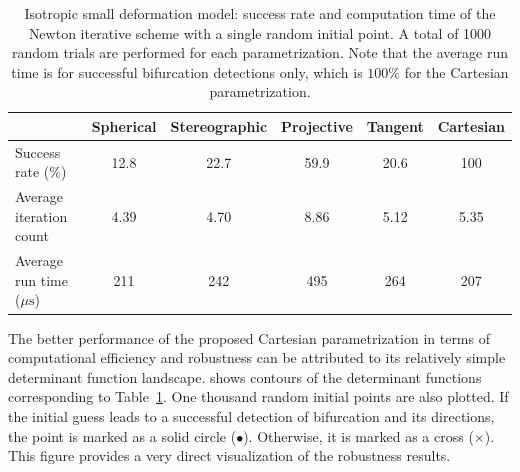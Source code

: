 \documentclass[12pt]{article}
\numberwithin{equation}{section}
\begin{document}
\begin{table}[!htbp]
  \begin{center}
    \begin{tabular}{l | c c c c c}
      \toprule
      & Spherical & Stereographic & Projective & Tangent & Cartesian \\
      \midrule
      Success rate ($\%$)      & 12.8 & 22.7 & 59.9  & 20.6  & 100   \\
      Average iteration count    & 4.39 & 4.70 & 8.86  & 5.12  & 5.35   \\
      Average run time (${\mu\text{s}}$) & 211  & 242  & 495  & 264  & 207 \\
      \bottomrule
    \end{tabular}
    \caption{Isotropic small deformation model: success rate and
      computation time of the Newton iterative scheme with a single
      random initial point. A total of 1000 random trials are
      performed for each parametrization. Note that the average run
      time is for successful bifurcation detections only, which is
      $100\%$ for the Cartesian parametrization.}
    \label{tab:iso-shear-random-para}
  \end{center}
\end{table}

The better performance of the proposed Cartesian parametrization in
terms of computational efficiency and robustness can be attributed to
its relatively simple determinant function landscape.
 shows contours of the determinant
functions corresponding to Table~\ref{tab:iso-shear-random-para}. One
thousand random initial points are also plotted. If the initial guess
leads to a successful detection of bifurcation and its directions, the
point is marked as a solid circle ($\bullet$). Otherwise, it is marked
as a cross ($\times$). This figure provides a very direct
visualization of the robustness results.
\end{document}
